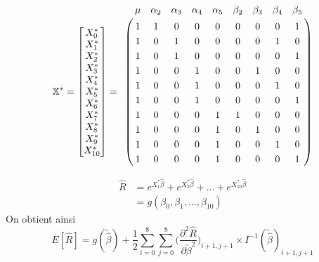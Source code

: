 \begin{align*}
\mathbb{X}^* =
\begin{bmatrix} 
X^*_0 \\
X^*_1 \\
X^*_2 \\
X^*_3 \\
X^*_4 \\
X^*_5 \\
X^*_6 \\
X^*_7 \\
X^*_8 \\
X^*_9 \\
X^*_{10} \\
\end{bmatrix}
=
\bordermatrix { 
& \mu  &\alpha_2 &\alpha_3 &\alpha_4 & \alpha_5  & \beta_2 & \beta_3 & \beta_4 & \beta_5 \cr 
& 1 & 1 & 0 & 0 & 0 & 0 & 0 & 0 & 1 \cr 
& 1 & 0 & 1 & 0 & 0 & 0 & 0 & 1 & 0 \cr 
& 1 & 0 & 1 & 0 & 0 & 0 & 0 & 0 & 1 \cr 
& 1 & 0 & 0 & 1 & 0 & 0 & 1 & 0 & 0 \cr 
& 1 & 0 & 0 & 1 & 0 & 0 & 0 & 1 & 0 \cr 
& 1 & 0 & 0 & 1 & 0 & 0 & 0 & 0 & 1 \cr 
& 1 & 0 & 0 & 0 & 1 & 1 & 0 & 0 & 0 \cr 
& 1 & 0 & 0 & 0 & 1 & 0 & 1 & 0 & 0 \cr 
& 1 & 0 & 0 & 0 & 1 & 0 & 0 & 1 & 0 \cr 
& 1 & 0 & 0 & 0 & 1 & 0 & 0 & 0 & 1 \cr 
}
\end{align*}


\begin{align*}
\widehat{R} &= e^{X_1^*\widehat{\beta}} + e^{X_2^*\widehat{\beta}} + ... + e^{X_{10}^*\widehat{\beta}} \\
&= g(\beta_0, \beta_1, ..., \beta_{10})
\end{align*}
On obtient ainsi 
\begin{equation}
E[\widehat{R}] = g(\utilde{\widehat{\beta}}) + \frac{1}{2} \sum_{i=0}^{8} \sum_{j=0}^{8} \Bigg( \frac{\partial^2 \widehat{R}}{\partial \utilde{\beta}^2} \Bigg)_{i+1,j+1} \times I^{-1}(\utilde{\widehat{\beta}})_{i+1,j+1}
\end{equation}

